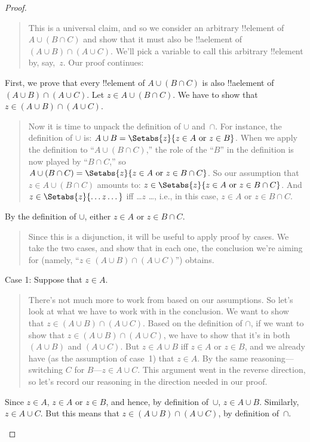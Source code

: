 \documentclass[../../../include/open-logic-section]{subfiles}
\begin{document}
\begin{proof}
\begin{quote}
This is a universal claim, and so we consider an arbitrary !!{element}
of $A \cup (B \cap C)$ and show that it must also be !!a{element} of
$(A \cup B) \cap (A \cup C)$. We'll pick a variable to call this
arbitrary !!{element} by, say,~$z$.  Our proof continues:
\end{quote}
First, we prove that every !!{element} of $A \cup (B \cap C)$ is also
!!a{element} of $(A \cup B) \cap (A \cup C)$. Let $z \in A \cup (B
\cap C)$. We have to show that $z \in (A \cup B) \cap (A \cup C)$.
\begin{quote}  
Now it is time to unpack the definition of $\cup$ and~$\cap$. For
instance, the definition of $\cup$ is: $A \cup B = \Setabs{z}{z \in A
  \text{ or } z \in B}$.  When we apply the definition to ``$A \cup (B
\cap C)$,'' the role of the ``$B$'' in the definition is now played by
``$B \cap C$,'' so $A \cup (B \cap C) = \Setabs{z}{z \in A \text{ or }
  z \in B \cap C}$.  So our assumption that $z \in A \cup (B \cap C)$
amounts to: $z \in \Setabs{z}{z \in A \text{ or } z \in B \cap
  C}$. And $z \in \Setabs{z}{\dots z\dots}$ iff \dots $z$ \dots, i.e.,
in this case, $z \in A$ or $z \in B \cap C$.
\end{quote}
By the definition of $\cup$, either $z \in A$ or $z \in B \cap C$.
\begin{quote}
Since this is a disjunction, it will be useful to apply proof by
cases. We take the two cases, and show that in each one, the
conclusion we're aiming for (namely, ``$z \in (A \cup B) \cap (A \cup
C)$'') obtains.
\end{quote}
Case 1: Suppose that $z \in A$.
\begin{quote}
There's not much more to work from based on our assumptions. So let's
look at what we have to work with in the conclusion. We want to show
that $z \in (A \cup B) \cap (A \cup C)$. Based on the definition of
$\cap$, if we want to show that $z \in (A \cup B) \cap (A \cup C)$, we
have to show that it's in both $(A \cup B)$ and $(A \cup C)$. But $z
\in A \cup B$ iff $z \in A$ or $z \in B$, and we already have (as the
assumption of case~1) that $z \in A$. By the same
reasoning---switching $C$ for $B$---$z \in A \cup C$. This argument
went in the reverse direction, so let's record our reasoning in the
direction needed in our proof.
\end{quote}
Since $z \in A$, $z \in A$ or $z \in B$, and hence, by definition
of~$\cup$, $z \in A \cup B$. Similarly, $z \in A \cup C$.  But this
means that $z \in (A \cup B) \cap (A \cup C)$, by definition
of~$\cap$.
\begin{quote}

\end{quote}
\end{proof}
\end{document}
